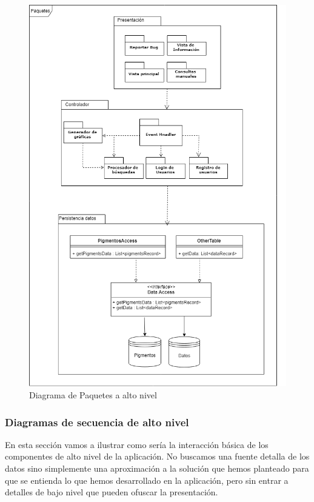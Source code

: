\begin{figure}[H]
    \centering
    \includegraphics[scale=0.6]{imagenes/diseno/arquitecturaAltoNivel.png}
    \caption{Diagrama de Paquetes a alto nivel}
    \label{fig:diagramaPaquetes}
\end{figure}

\subsubsection*{Diagramas de secuencia de alto nivel}

En esta sección vamos a ilustrar como sería la interacción básica de los componentes de alto nivel de la aplicación. No buscamos una fuente detalla de los datos sino simplemente una aproximación a la solución que hemos planteado para que se entienda lo que hemos desarrollado en la aplicación, pero sin entrar a detalles de bajo nivel que pueden ofuscar la presentación. 

